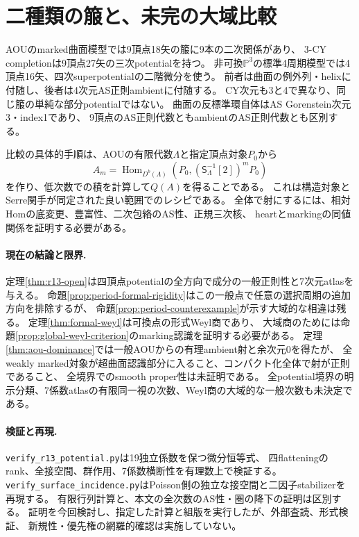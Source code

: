 \documentclass[11pt,a4paper]{ltjsarticle}
\theoremstyle{definition}\newtheorem{remark}[theorem]{注意}
\newcommand{\PP}{\mathbb P}\newcommand{\kk}{\mathbb C}
\newcommand{\Hom}{\operatorname{Hom}}\newcommand{\HH}{\operatorname{HH}}
\begin{document}
\section{二種類の箙と、未完の大域比較}
AOUのmarked曲面模型では9頂点18矢の箙に9本の二次関係があり、
3-CY completionは9頂点27矢の三次potentialを持つ。
非可換$\PP^3$の標準4周期模型では4頂点16矢、四次superpotentialの二階微分を使う。
前者は曲面の例外列・helixに付随し、後者は4次元AS正則ambientに付随する。
CY次元も3と4で異なり、同じ箙の単純な部分potentialではない。
曲面の反標準環自体はAS Gorenstein次元3・index1であり、
9頂点のAS正則代数ともambientのAS正則代数とも区別する。

比較の具体的手順は、AOUの有限代数$\Lambda$と指定頂点対象$P_0$から
\[
 A_m=\Hom_{D^b(\Lambda)}
       (P_0,(\mathsf S_\Lambda^{-1}[2])^m P_0)
\]
を作り、低次数での積を計算して$Q(A)$を得ることである。
これは構造対象とSerre関手が同定された良い範囲でのレシピである。
全体で射にするには、相対Homの底変更、豊富性、二次包絡のAS性、正規三次核、
heartとmarkingの同値関係を証明する必要がある。

\paragraph{現在の結論と限界.}
定理\ref{thm:r13-open}は四頂点potentialの全方向で成分の一般正則性と7次元atlasを与える。
命題\ref{prop:period-formal-rigidity}はこの一般点で任意の選択周期の追加方向を排除するが、
命題\ref{prop:period-counterexample}が示す大域的な相違は残る。
定理\ref{thm:formal-weyl}は可換点の形式Weyl商であり、
大域商のためには命題\ref{prop:global-weyl-criterion}のmarking認識を証明する必要がある。
定理\ref{thm:aou-dominance}では一般AOUからの有理ambient射と余次元0を得たが、
全weakly marked対象が超曲面認識部分に入ること、コンパクト化全体で射が正則であること、
全境界でのsmooth proper性は未証明である。
全potential境界の明示分類、7係数atlasの有限同一視の次数、Weyl商の大域的な一般次数も未決定である。

\paragraph{検証と再現.}
\texttt{verify\_r13\_potential.py}は19独立係数を保つ微分恒等式、
四flatteningのrank、全接空間、群作用、7係数横断性を有理数上で検証する。
\texttt{verify\_surface\_incidence.py}はPoisson側の独立な接空間と二因子stabilizerを再現する。
有限行列計算と、本文の全次数のAS性・圏の降下の証明は区別する。
証明を今回検討し、指定した計算と組版を実行したが、外部査読、形式検証、
新規性・優先権の網羅的確認は実施していない。
\end{document}
